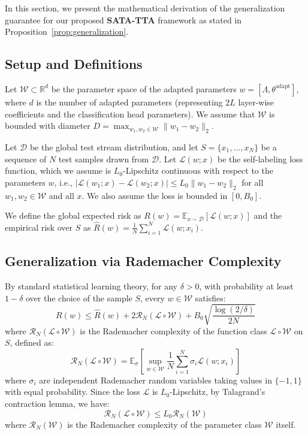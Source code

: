 \documentclass{article}
\theoremstyle{plain}
\theoremstyle{definition}
\theoremstyle{remark}
\begin{document}
In this section, we present the mathematical derivation of the generalization guarantee for our proposed \textbf{SATA-TTA} framework as stated in Proposition~\ref{prop:generalization}.

\subsection{Setup and Definitions}
Let $\mathcal{W} \subset \mathbb{R}^d$ be the parameter space of the adapted parameters $w = [\Lambda, \theta^{\text{adapt}}]$, where $d$ is the number of adapted parameters (representing $2L$ layer-wise coefficients and the classification head parameters). We assume that $\mathcal{W}$ is bounded with diameter $D = \max_{w_1, w_2 \in \mathcal{W}} \|w_1 - w_2\|_2$. 

Let $\mathcal{D}$ be the global test stream distribution, and let $S = \{x_1, \dots, x_N\}$ be a sequence of $N$ test samples drawn from $\mathcal{D}$. Let $\mathcal{L}(w; x)$ be the self-labeling loss function, which we assume is $L_0$-Lipschitz continuous with respect to the parameters $w$, i.e., $|\mathcal{L}(w_1; x) - \mathcal{L}(w_2; x)| \le L_0 \|w_1 - w_2\|_2$ for all $w_1, w_2 \in \mathcal{W}$ and all $x$. We also assume the loss is bounded in $[0, B_0]$.

We define the global expected risk as $R(w) = \mathbb{E}_{x \sim \mathcal{D}} [\mathcal{L}(w; x)]$ and the empirical risk over $S$ as $\hat{R}(w) = \frac{1}{N} \sum_{i=1}^N \mathcal{L}(w; x_i)$.

\subsection{Generalization via Rademacher Complexity}
By standard statistical learning theory, for any $\delta > 0$, with probability at least $1 - \delta$ over the choice of the sample $S$, every $w \in \mathcal{W}$ satisfies:
\begin{equation}
  R(w) \le \hat{R}(w) + 2 \mathcal{R}_N(\mathcal{L} \circ \mathcal{W}) + B_0 \sqrt{\frac{\log(2/\delta)}{2N}}
\end{equation}
where $\mathcal{R}_N(\mathcal{L} \circ \mathcal{W})$ is the Rademacher complexity of the function class $\mathcal{L} \circ \mathcal{W}$ on $S$, defined as:
\begin{equation}
  \mathcal{R}_N(\mathcal{L} \circ \mathcal{W}) = \mathbb{E}_{\sigma} \left[ \sup_{w \in \mathcal{W}} \frac{1}{N} \sum_{i=1}^N \sigma_i \mathcal{L}(w; x_i) \right]
\end{equation}
where $\sigma_i$ are independent Rademacher random variables taking values in $\{-1, 1\}$ with equal probability. Since the loss $\mathcal{L}$ is $L_0$-Lipschitz, by Talagrand's contraction lemma, we have:
\begin{equation}
  \mathcal{R}_N(\mathcal{L} \circ \mathcal{W}) \le L_0 \mathcal{R}_N(\mathcal{W})
\end{equation}
where $\mathcal{R}_N(\mathcal{W})$ is the Rademacher complexity of the parameter class $\mathcal{W}$ itself.
\end{document}
